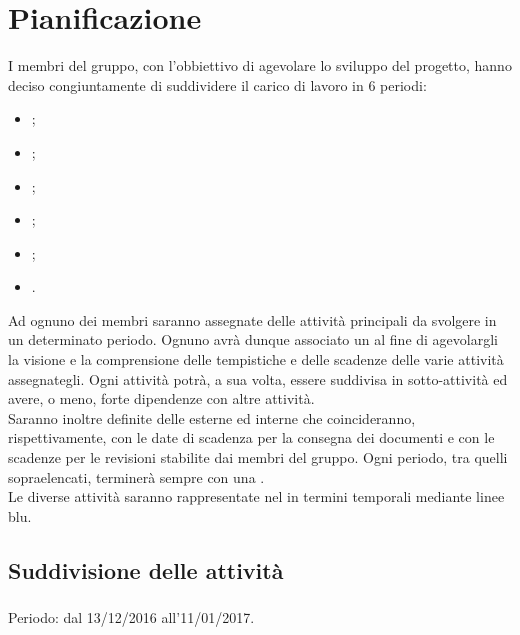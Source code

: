 \newpage
\section{Pianificazione}
I membri del gruppo, con l'obbiettivo di agevolare lo sviluppo del progetto, hanno deciso congiuntamente di suddividere il carico di lavoro in 6 periodi:
\begin{itemize}
	\item \ARM;
	\item \ARD;
	\item \PA;
	\item \PD;
	\item \COD;
	\item \VV.
\end{itemize}

Ad ognuno dei membri saranno assegnate delle attività principali da svolgere in un determinato periodo. Ognuno avrà dunque associato un  al fine di agevolargli la visione e la comprensione delle tempistiche e delle scadenze delle varie attività assegnategli.
Ogni attività potrà, a sua volta, essere suddivisa in sotto-attività ed avere, o meno, forte dipendenze con altre attività.\\
Saranno inoltre definite delle  esterne ed interne che coincideranno, rispettivamente, con le date di scadenza per la consegna dei documenti e con le scadenze per le revisioni stabilite dai membri del gruppo.
Ogni periodo, tra quelli sopraelencati, terminerà sempre con una .\\

Le diverse attività saranno rappresentate nel  in termini temporali mediante linee blu.

\subsection{Suddivisione delle attività}

\subsubsection{\ARM}
Periodo: dal 13/12/2016 all'11/01/2017. \\

